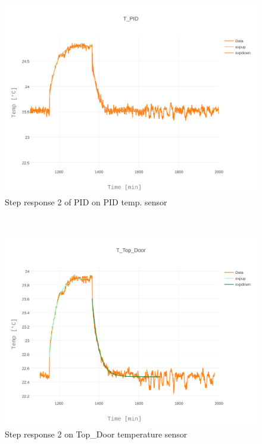 \documentclass[12pt]{scrartcl}
\begin{document}
      \begin{figure}[h!]
        \centering
        \includegraphics[width = \textwidth]{./plots/plot_image(16)}
        \caption{Step response 2 of PID on PID temp. sensor}
        \label{fig15}
      \end{figure}\\
      \begin{figure}[h!]
        \centering
        \includegraphics[width = \textwidth]{./plots/plot_image(17)}
        \caption{Step response 2 on Top\_Door temperature sensor}
        \label{fig16}
      \end{figure}\\
      \clearpage
\end{document}
